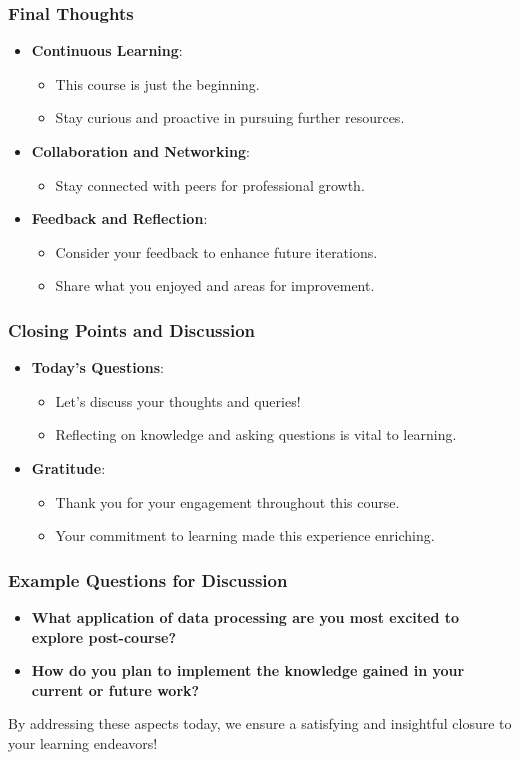 \documentclass[aspectratio=169]{beamer}
\begin{document}
\begin{frame}[fragile]
    \frametitle{Final Thoughts}
    \begin{itemize}
        \item \textbf{Continuous Learning}:
        \begin{itemize}
            \item This course is just the beginning.
            \item Stay curious and proactive in pursuing further resources.
        \end{itemize}
        \item \textbf{Collaboration and Networking}:
        \begin{itemize}
            \item Stay connected with peers for professional growth.
        \end{itemize}
        \item \textbf{Feedback and Reflection}:
        \begin{itemize}
            \item Consider your feedback to enhance future iterations.
            \item Share what you enjoyed and areas for improvement.
        \end{itemize}
    \end{itemize}
\end{frame}

\begin{frame}[fragile]
    \frametitle{Closing Points and Discussion}
    \begin{itemize}
        \item \textbf{Today’s Questions}:
        \begin{itemize}
            \item Let's discuss your thoughts and queries!
            \item Reflecting on knowledge and asking questions is vital to learning.
        \end{itemize}
        \item \textbf{Gratitude}:
        \begin{itemize}
            \item Thank you for your engagement throughout this course.
            \item Your commitment to learning made this experience enriching.
        \end{itemize}
    \end{itemize}
\end{frame}

\begin{frame}[fragile]
    \frametitle{Example Questions for Discussion}
    \begin{itemize}
        \item \textbf{What application of data processing are you most excited to explore post-course?}
        \item \textbf{How do you plan to implement the knowledge gained in your current or future work?}
    \end{itemize}
    By addressing these aspects today, we ensure a satisfying and insightful closure to your learning endeavors!
\end{frame}
\end{document}
